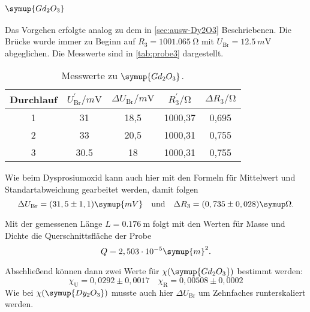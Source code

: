 \subsubsection{$\symup{Gd_2O_3}$}

Das Vorgehen erfolgte analog zu dem in \autoref{sec:ausw-Dy2O3} Beschriebenen. Die Brücke
wurde immer zu Beginn auf $R_3 = \SI{1001.065}{\ohm}$ mit $U_\text{Br} =
\SI{12.5}{m\volt}$ abgeglichen. Die Messwerte sind in \autoref{tab:probe3} dargestellt.

\begin{table}
  \centering
  \caption{Messwerte zu $\symup{Gd_2O_3}$.}
  \label{tab:probe3}
  \begin{tabular}{c c c c c}
  \toprule
  Durchlauf &
  $U_\text{Br}^\prime / \si{m\volt}$ &
  $\Delta U_\text{Br} / \si{m\volt}$ &
  $R_3^\prime / \si{\ohm} $ &
  $\Delta R_3 / \si{\ohm} $ \\
  \midrule
  1 & 31 & 18,5 & 1000,37 & 0,695 \\
  2 & 33 & 20,5 & 1000,31 & 0,755 \\
  3 & 30.5 & 18 & 1000,31 & 0,755 \\
  \bottomrule
  \end{tabular}
\end{table}

Wie beim Dysprosiumoxid kann auch hier mit den Formeln für Mittelwert und
Standartabweichung gearbeitet werden, damit folgen 
\begin{equation}
	\Delta U_\text{Br} = (31,5 \pm 1,1) \symup{mV}
	\quad
	\text{und}
	\quad
	\Delta R_3 = (0,735 \pm 0,028) \symup\Omega.
\end{equation}

Mit der gemessenen Länge $L = \SI{0.176}{\meter}$ folgt mit den Werten für Masse und Dichte
die Querschnittsfläche der Probe
\begin{equation}
	Q = 2,503 \cdot 10^{-5} \symup{m}^2.
\end{equation}

Abschließend können dann zwei Werte für $\chi(\symup{Gd_2O_3})$ bestimmt werden:
\begin{equation}
	\chi_\text{U} = 0,0292 \pm 0,0017
	\quad
	\chi_\text{R} = 0,00508 \pm 0,0002
\end{equation}
Wie bei $\chi(\symup{Dy_2O_3})$ musste auch hier $\Delta U_\text{Br}$ um Zehnfaches
runterskaliert werden.

